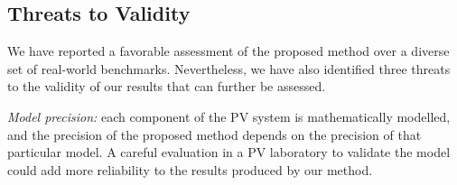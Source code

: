 \documentclass[journal]{IEEEtran}
\begin{document}
%
%
%
\subsection{Threats to Validity}
We have reported a favorable assessment of the proposed method over a diverse set of real-world benchmarks. Nevertheless, we have also identified three threats to the validity of our results that can further be assessed.

\textit{Model precision:} each component of the PV system is mathematically modelled, and the precision of the proposed method depends on the precision of that particular model. A careful evaluation in a PV laboratory to validate the model could add more reliability to the results produced by our method.
\end{document}
